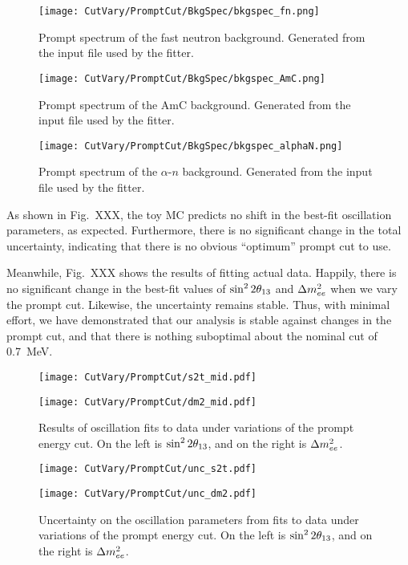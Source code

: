 \documentclass[../thesis.tex]{subfiles}
\begin{document}
\begin{figure}[h]
  \texttt{[image: CutVary/PromptCut/BkgSpec/bkgspec\_fn.png]}
  \caption{Prompt spectrum of the fast neutron background. Generated from the input file used by the fitter.}
  \label{fig:bkgspec_fn}
\end{figure}

\begin{figure}[h]
  \texttt{[image: CutVary/PromptCut/BkgSpec/bkgspec\_AmC.png]}
  \caption{Prompt spectrum of the AmC background. Generated from the input file used by the fitter.}
  \label{fig:bkgspec_AmC}
\end{figure}

\begin{figure}[h]
  \texttt{[image: CutVary/PromptCut/BkgSpec/bkgspec\_alphaN.png]}
  \caption{Prompt spectrum of the $\alpha$-$n$ background. Generated from the input file used by the fitter.}
  \label{fig:bkgspec_alphaN}
\end{figure}

As shown in Fig.~XXX, the toy MC predicts no shift in the best-fit oscillation parameters, as expected. Furthermore, there is no significant change in the total uncertainty, indicating that there is no obvious ``optimum'' prompt cut to use.

Meanwhile, Fig.~XXX shows the results of fitting actual data. Happily, there is no significant change in the best-fit values of $\sin^2 2\theta_{13}$ and $\Delta m^2_{ee}$ when we vary the prompt cut. Likewise, the uncertainty remains stable. Thus, with minimal effort, we have demonstrated that our analysis is stable against changes in the prompt cut, and that there is nothing suboptimal about the nominal cut of 0.7~MeV.

\begin{figure}[ht]
  \begin{minipage}{0.5\linewidth}%
    \texttt{[image: CutVary/PromptCut/s2t\_mid.pdf]}%
  \end{minipage}%
  \begin{minipage}{0.5\linewidth}%
    \texttt{[image: CutVary/PromptCut/dm2\_mid.pdf]}%
  \end{minipage}%
  \caption{Results of oscillation fits to data under variations of the prompt energy cut. On the left is $\sin^2 2\theta_{13}$, and on the right is $\Delta m^2_{ee}$.}
  \label{fig:cutVaryPromptCutResultsData}
\end{figure}

\begin{figure}[ht]
  \begin{minipage}{0.5\linewidth}%
    \texttt{[image: CutVary/PromptCut/unc\_s2t.pdf]}%
  \end{minipage}%
  \begin{minipage}{0.5\linewidth}%
    \texttt{[image: CutVary/PromptCut/unc\_dm2.pdf]}%
  \end{minipage}%
  \caption{Uncertainty on the oscillation parameters from fits to data under variations of the prompt energy cut. On the left is $\sin^2 2\theta_{13}$, and on the right is $\Delta m^2_{ee}$.}
  \label{fig:cutVaryPromptCutUncData}
\end{figure}
\end{document}

